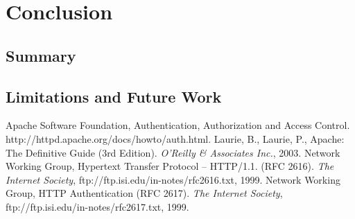 \documentclass{llncs}
\begin{document}
  \section{Conclusion}

    \subsection{Summary}

    \subsection{Limitations and Future Work}

  \begin{thebibliography}{5}
      Apache Software Foundation,
      Authentication, Authorization and Access Control.
      http://httpd.apache.org/docs/howto/auth.html.
      Laurie, B., Laurie, P.,
      Apache: The Definitive Guide (3rd Edition).
      {\em O'Reilly \& Associates Inc.}, 2003.
      Network Working Group,
      Hypertext Transfer Protocol -- HTTP/1.1. (RFC 2616).
      {\em The Internet Society},
      ftp://ftp.isi.edu/in-notes/rfc2616.txt, 1999.
      Network Working Group,
      HTTP Authentication (RFC 2617).
      {\em The Internet Society},
      ftp://ftp.isi.edu/in-notes/rfc2617.txt, 1999.
  \end{thebibliography}
\end{document}

